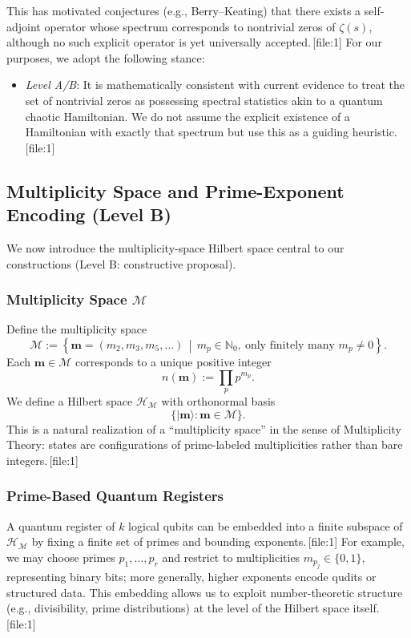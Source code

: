 \documentclass[11pt]{article}
\begin{document}
This has motivated conjectures (e.g., Berry--Keating) that there exists a self-adjoint operator whose spectrum corresponds to nontrivial zeros of \(\zeta(s)\), although no such explicit operator is yet universally accepted.\,[file:1] For our purposes, we adopt the following stance:

\begin{itemize}[leftmargin=*]
    \item \emph{Level A/B}: It is mathematically consistent with current evidence to treat the set of nontrivial zeros as possessing spectral statistics akin to a quantum chaotic Hamiltonian. We do not assume the explicit existence of a Hamiltonian with exactly that spectrum but use this as a guiding heuristic.\,[file:1]
\end{itemize}

\subsection{Multiplicity Space and Prime-Exponent Encoding (Level B)}

We now introduce the multiplicity-space Hilbert space central to our constructions (Level B: constructive proposal).

\subsubsection{Multiplicity Space \(\mathcal{M}\)}

Define the multiplicity space
\[
\mathcal{M} := \left\{ \mathbf{m} = (m_2, m_3, m_5, \dots) \,\middle|\, m_p \in \mathbb{N}_0,\ \text{only finitely many } m_p \neq 0 \right\}.
\]
Each \(\mathbf{m} \in \mathcal{M}\) corresponds to a unique positive integer
\[
n(\mathbf{m}) := \prod_{p} p^{m_p}.
\]
We define a Hilbert space \(\mathcal{H}_{\mathcal{M}}\) with orthonormal basis
\[
\{ \lvert \mathbf{m} \rangle : \mathbf{m} \in \mathcal{M} \}.
\]
This is a natural realization of a ``multiplicity space'' in the sense of Multiplicity Theory: states are configurations of prime-labeled multiplicities rather than bare integers.\,[file:1]

\subsubsection{Prime-Based Quantum Registers}

A quantum register of \(k\) logical qubits can be embedded into a finite subspace of \(\mathcal{H}_{\mathcal{M}}\) by fixing a finite set of primes and bounding exponents.\,[file:1] For example, we may choose primes \(p_1, \dots, p_r\) and restrict to multiplicities \(m_{p_j} \in \{0,1\}\), representing binary bits; more generally, higher exponents encode qudits or structured data. This embedding allows us to exploit number-theoretic structure (e.g., divisibility, prime distributions) at the level of the Hilbert space itself.\,[file:1]
\end{document}
